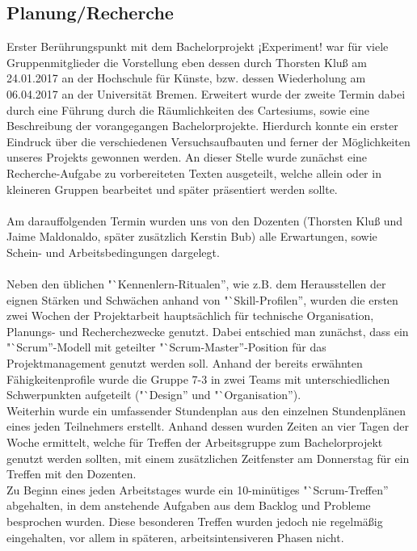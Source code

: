 \documentclass{Bericht}
\begin{document}
	\subsection{Planung/Recherche} %
		Erster Berührungspunkt mit dem Bachelorprojekt ¡Experiment! war für viele Gruppenmitglieder die Vorstellung eben dessen durch Thorsten Kluß am 24.01.2017 an der Hochschule für Künste, bzw. dessen Wiederholung am 06.04.2017 an der Universität Bremen. Erweitert wurde der zweite Termin dabei durch eine Führung durch die Räumlichkeiten des Cartesiums, sowie eine Beschreibung der vorangegangen Bachelorprojekte. Hierdurch konnte ein erster Eindruck über die verschiedenen Versuchsaufbauten und ferner der Möglichkeiten unseres Projekts gewonnen werden. An dieser Stelle wurde zunächst eine Recherche-Aufgabe zu vorbereiteten Texten ausgeteilt, welche allein oder in kleineren Gruppen bearbeitet und später präsentiert werden sollte.\\
\\
		Am darauffolgenden Termin wurden uns von den Dozenten (Thorsten Kluß und Jaime Maldonaldo, später zusätzlich Kerstin Bub) alle Erwartungen, sowie Schein- und Arbeitsbedingungen dargelegt.\\
\\
		Neben den üblichen "`Kennenlern-Ritualen'', wie z.B. dem Herausstellen der eignen Stärken und Schwächen anhand von "`Skill-Profilen'', wurden die ersten zwei Wochen der Projektarbeit hauptsächlich für technische Organisation, Planungs- und Recherchezwecke genutzt. Dabei entschied man zunächst, dass ein "`Scrum''-Modell mit geteilter "`Scrum-Master''-Position für das Projektmanagement genutzt werden soll. Anhand der bereits erwähnten Fähigkeitenprofile wurde die Gruppe 7-3 in zwei Teams mit unterschiedlichen Schwerpunkten aufgeteilt ("`Design'' und "`Organisation'').\\
		Weiterhin wurde ein umfassender Stundenplan aus den einzelnen Stundenplänen eines jeden Teilnehmers erstellt. Anhand dessen wurden Zeiten an vier Tagen der Woche ermittelt, welche für Treffen der Arbeitsgruppe zum Bachelorprojekt genutzt werden sollten, mit einem zusätzlichen Zeitfenster am Donnerstag für ein Treffen mit den Dozenten. \\
		Zu Beginn eines jeden Arbeitstages wurde ein 10-minütiges "`Scrum-Treffen'' abgehalten, in dem anstehende Aufgaben aus dem Backlog und Probleme besprochen wurden. Diese besonderen Treffen wurden jedoch nie regelmäßig eingehalten, vor allem in späteren, arbeitsintensiveren Phasen nicht.\\
\end{document}
